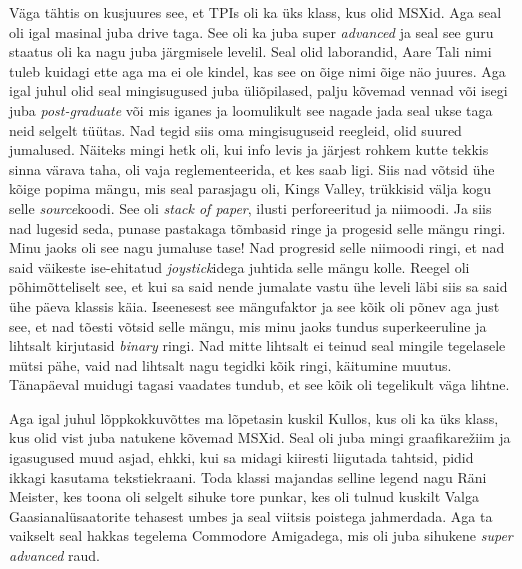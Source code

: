 Väga tähtis on kusjuures see, et TPIs oli ka üks klass, kus olid MSXid. Aga seal oli igal masinal juba drive taga. See oli ka juba super \emph{advanced} ja seal see guru staatus oli ka nagu juba järgmisele levelil. Seal olid  laborandid,
Aare Tali nimi tuleb kuidagi ette aga ma ei ole kindel, kas see on õige nimi õige näo juures. Aga igal juhul olid seal mingisugused juba üliõpilased,  palju kõvemad vennad või isegi juba \emph{post-graduate} või mis iganes ja loomulikult see nagade jada seal ukse taga neid selgelt tüütas. Nad tegid siis oma mingisuguseid reegleid, olid suured jumalused. Näiteks mingi hetk oli, kui info levis ja järjest rohkem kutte tekkis sinna värava taha,  oli vaja reglementeerida, et kes saab ligi. Siis nad võtsid ühe kõige popima mängu, mis seal parasjagu oli, Kings Valley, trükkisid välja kogu selle \emph{source}koodi. See oli \emph{stack of paper}, ilusti perforeeritud ja niimoodi. Ja siis nad lugesid seda, punase pastakaga tõmbasid ringe ja progesid selle mängu ringi. Minu jaoks oli see nagu jumaluse tase! Nad progresid selle niimoodi ringi, et nad said väikeste ise-ehitatud \emph{joystick}idega juhtida selle mängu kolle. Reegel oli põhimõtteliselt see, et kui sa said nende jumalate vastu ühe leveli läbi siis sa said ühe päeva klassis käia. Iseenesest see mängufaktor ja see kõik oli põnev aga just see, et nad tõesti võtsid selle mängu, mis minu jaoks tundus superkeeruline ja lihtsalt kirjutasid \emph{binary} ringi. Nad mitte lihtsalt ei teinud seal mingile tegelasele mütsi pähe,  vaid nad lihtsalt nagu tegidki kõik ringi, käitumine muutus. Tänapäeval muidugi tagasi vaadates tundub, et see kõik oli tegelikult väga lihtne.


Aga igal juhul lõppkokkuvõttes ma lõpetasin kuskil Kullos, kus oli ka üks klass, kus olid vist juba natukene kõvemad MSXid. Seal oli juba  mingi graafikarežiim ja igasugused muud asjad, ehkki, kui sa midagi kiiresti liigutada tahtsid, pidid ikkagi kasutama tekstiekraani. Toda klassi majandas selline legend nagu Räni Meister, kes toona oli selgelt sihuke tore punkar, kes oli tulnud kuskilt Valga Gaasianalüsaatorite tehasest umbes ja seal viitsis poistega jahmerdada. Aga ta vaikselt seal hakkas tegelema Commodore Amigadega, mis oli juba sihukene \emph{super advanced} raud. 

